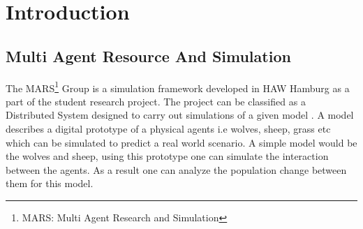 \newpage
\chapter{Introduction}
    \section{Multi Agent Resource And Simulation}
        \label{section:MARS}
        The MARS\footnote{MARS: Multi Agent Research and Simulation} Group is a simulation framework developed 
        in HAW Hamburg as a  part of the student research project. The project can be classified as a
        Distributed System \cite{DistributedSystems} designed to carry out simulations of a given model 
        \cite{HAWHamburgMARS}. 
        A model describes a digital prototype of a physical agents i.e wolves, sheep, grass etc 
        which can be simulated to predict a real world scenario. A simple model would
        be the wolves and sheep, using this prototype one can simulate the interaction between the agents. 
        As a result one can analyze the population change between them for this model. 


